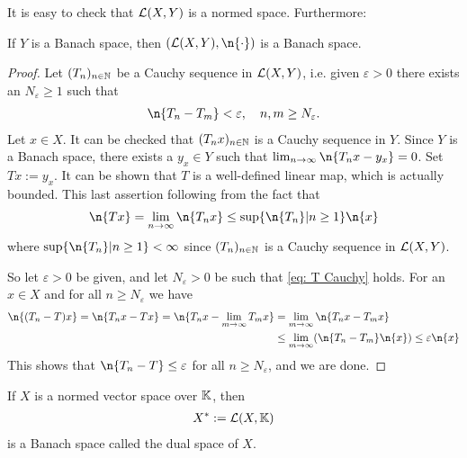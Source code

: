\documentclass[../../main.tex]{subfiles}
\begin{document}
It is easy to check that $\mathcal{L}(X,Y)$ is a normed space. Furthermore:
\begin{theorem}
If $Y$ is a Banach space, then $(\m{L}(X, Y), \n{\cdot})$ is a Banach space.
\end{theorem}
\begin{proof}
Let $(T_{n})_{n\in \mathbb{N}}$ be a Cauchy sequence in $\mathcal{L}(X,Y)$, i.e. given $\varepsilon > 0$ there exists an $N_{\varepsilon}\ge 1$ such that
\begin{align*}
	\n{T_{n}-T_{m}} < \varepsilon, \quad n,m\ge N_{\varepsilon}. \label{eq: T Cauchy}
\end{align*}
Let $x\in X$. It can be checked that $(T_{n}x)_{n\in \mathbb{N}}$ is a Cauchy sequence in $Y$. Since $Y$ is a Banach space, there exists a $y_{x}\in Y$ such that $\lim_{n\to \infty}\n{T_{n}x-y_{x}}=0$. Set $Tx:=y_{x}$. It can be shown that $T$ is a well-defined linear map, which is actually bounded. This last assertion following from the fact that
\begin{align*}
	\n{Tx} = \lim_{n\to \infty} \n{T_{n}x} \le \sup\{ \n{T_{n}} | n \ge 1 \} \n{x}
\end{align*}
where $\sup\{ \n{T_{n}} | n \ge 1 \}<\infty$ since $(T_{n})_{n\in \mathbb{N}}$ is a Cauchy sequence in $\mathcal{L}(X,Y)$.

So let $\varepsilon > 0$ be given, and let $N_{\varepsilon}>0$ be such that \eqref{eq: T Cauchy} holds. For an $x\in X$ and for all $n\ge N_{\varepsilon}$ we have
\begin{align*}
	\n{(T_{n}-T)x} = \n{T_{n}x - Tx} = \n{T_{n}x - \lim_{m\to \infty} T_{m}x} &= \lim_{m\to \infty} \n{T_{n}x-T_{m}x} \\
	&\le \lim_{m\to \infty} (\n{T_{n}-T_{m}}\n{x}) \le \varepsilon \n{x}
\end{align*}
This shows that $\n{T_{n}-T}\le \varepsilon$ for all $n\ge N_{\varepsilon}$, and we are done.
\end{proof}

\begin{corollary}
If $X$ is a normed vector space over $\mathbb{K}$, then
\begin{align*}
	X^{*}:=\mathcal{L}(X,\mathbb{K})
\end{align*}
is a Banach space called the dual space of $X$.
\end{corollary}



\end{document}
